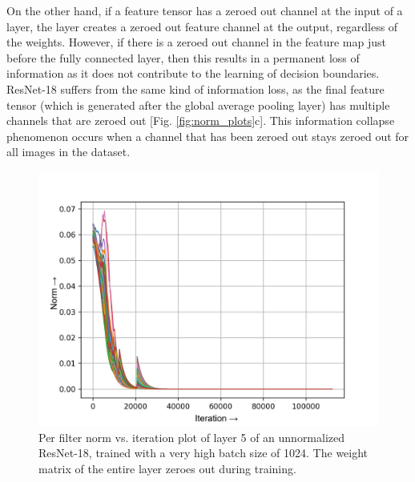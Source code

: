 \documentclass[times,sort&compress]{elsarticle}
\begin{document}
On the other hand, if a feature tensor has a zeroed out channel at the input of a layer,
the layer creates a zeroed out feature channel at the output, regardless of the weights.
However, if there is a zeroed out channel in the feature map just before the fully
connected layer, then this results in a permanent loss of information as it does not
contribute to the learning of decision boundaries. ResNet-18 suffers from the same kind
of information loss, as the final feature tensor (which is generated after the global
average pooling layer) has multiple channels that are zeroed out [Fig.
\ref{fig:norm_plots}c]. This information collapse phenomenon occurs when a channel that
has been zeroed out stays zeroed out for all images in the dataset.








\begin{figure}[t]
\centering
\includegraphics[width=0.45\columnwidth]{baseline_high_bs-w-layer2-2}
\caption{ Per filter norm vs. iteration plot of layer 5 of an unnormalized ResNet-18,
trained with a very high batch size of 1024. The weight matrix of the entire layer
zeroes out during training. }
\label{fig:high_bs}
\end{figure}
\end{document}
